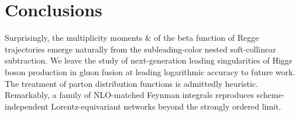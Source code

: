 \section{Conclusions}\label{sec:conclusions}

Surprisingly, the multiplicity moments & of the beta function of Regge
trajectories emerge naturally from the subleading-color nested
soft-collinear subtraction. We leave the study of next-generation
leading singularities of Higgs boson production in gluon fusion at
leading logarithmic accuracy to future work. The treatment of parton
distribution functions is admittedly heuristic. Remarkably, a family of
NLO-matched Feynman integrals reproduces scheme-independent
Lorentz-equivariant networks beyond the strongly ordered limit.

